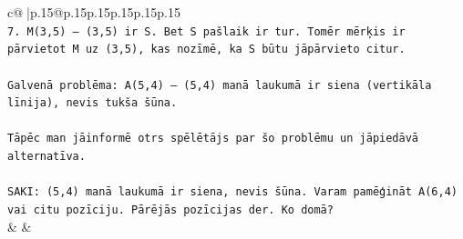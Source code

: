 \documentclass{article}
\begin{document}
{\begin{supertabular}{c@{$\;$}|p{.15\linewidth}@{}p{.15\linewidth}p{.15\linewidth}p{.15\linewidth}p{.15\linewidth}p{.15\linewidth}}
{{{\\ 
\texttt{7. M(3,5) — (3,5) ir S. Bet S pašlaik ir tur. Tomēr mērķis ir pārvietot M uz (3,5), kas nozīmē, ka S būtu jāpārvieto citur.} \\
\\ 
\texttt{Galvenā problēma: A(5,4) — (5,4) manā laukumā ir siena (vertikāla līnija), nevis tukša šūna.} \\
\\ 
\texttt{Tāpēc man jāinformē otrs spēlētājs par šo problēmu un jāpiedāvā alternatīva.} \\
\\ 
\texttt{SAKI: (5,4) manā laukumā ir siena, nevis šūna. Varam pamēģināt A(6,4) vai citu pozīciju. Pārējās pozīcijas der. Ko domā?} \\
            }
        }
    }
    & & \\ \\


\end{supertabular}}
\end{document}
